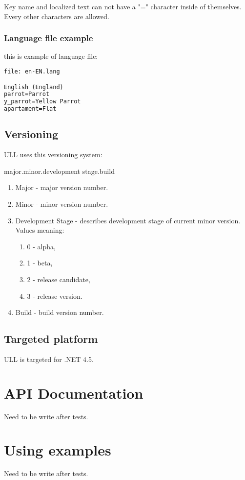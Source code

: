 \documentclass[a4paper]{report}
\begin{document}
Key name and localized text can not have a "=" character inside of themselves. Every other characters are allowed.

\subsection{Language file example}
this is example of language file:
\begin{lstlisting}[language=XML]
file: en-EN.lang

English (England)
parrot=Parrot
y_parrot=Yellow Parrot
apartament=Flat
\end{lstlisting}

\section{Versioning}
ULL uses this versioning system:

major.minor.development stage.build

\begin{enumerate}
\item Major - major version number.
\item Minor - minor version number.
\item Development Stage - describes development stage of current minor version. Values meaning:
\begin{enumerate}
\item 0 - alpha,
\item 1 - beta,
\item 2 - release candidate,
\item 3 - release version.
\end{enumerate}
\item Build - build version number.
\end{enumerate}

\section{Targeted platform}
ULL is targeted for .NET 4.5.

\chapter{API Documentation}
Need to be write after tests.

\chapter{Using examples}
Need to be write after tests.
\end{document}
